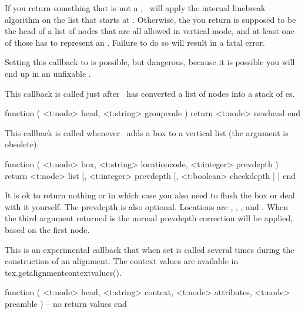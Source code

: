 If you return something that is not a , \LUATEX\ will apply the
internal linebreak algorithm on the list that starts at .
Otherwise, the  you return is supposed to be the head of a list of
nodes that are all allowed in vertical mode, and at least one of those has to
represent an \type {\hbox}. Failure to do so will result in a fatal error.

Setting this callback to  is possible, but dangerous, because it is
possible you will end up in an unfixable .

\stopsubsection

\startsubsection[title=post_linebreak_filter]

This callback is called just after \LUATEX\ has converted a list of nodes into a
stack of \type {\hbox}es.

\starttyping[option=LUA]
function (
    <t:node>   head,
    <t:string> groupcode
)
    return <t:node> newhead
end
\stoptyping

\stopsubsection

\startsubsection[title=append_to_vlist_filter]

This callback is called whenever \LUATEX\ adds a box to a vertical list (the
 argument is obsolete):

\starttyping[option=LUA]
function (
    <t:node>    box,
    <t:string>  locationcode,
    <t:integer> prevdepth
)
    return <t:node> list [, <t:integer> prevdepth [, <t:boolean> checkdepth ] ]
end
\stoptyping

It is ok to return nothing or  in which case you also need to flush
the box or deal with it yourself. The prevdepth is also optional. Locations are
, , ,  and
. When the third argument returned is  the
normal prevdepth correction will be applied, based on the first node.

\stopsubsection

\startsubsection[title=alignment_filter]

This is an experimental callback that when set is called several times during the
construction of an alignment. The context values are available in \typ
{tex.getalignmentcontextvalues()}.

\starttyping[option=LUA]
function (
    <t:node>   head,
    <t:string> context,
    <t:node>   attributes,
    <t:node>   preamble
)
    -- no return values
end
\stoptyping

